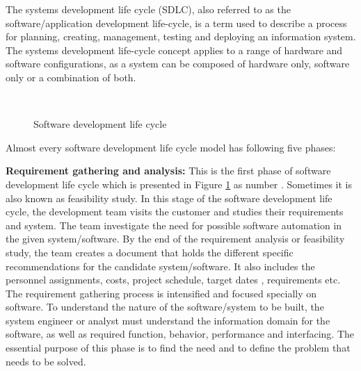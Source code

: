 The systems development life cycle (SDLC), also referred to as the software/application development life-cycle, is a term used to describe a process for planning, creating, management, testing and deploying an information system. The systems development life-cycle concept applies to a range of hardware and software configurations, as a system can be composed of hardware only, software only or a combination of both.

\begin{figure}[htbp]
	\centering
	\\
	\vspace{-3em}
	\caption{Software development life cycle}
	\label{figure_sdlc}
\end{figure}

Almost every software development life cycle model has following five phases:

\textbf{ Requirement gathering and analysis:}
This is the first phase of software development life cycle which is presented in Figure \ref{figure_sdlc} as number . Sometimes it is also known as feasibility study. In this stage of the software development life cycle, the development team visits the customer and studies their requirements and system. The team investigate the need for possible software automation in the given system/software. By the end of the requirement analysis or feasibility study, the team creates a document that holds the different specific recommendations for the candidate system/software. It also includes the personnel assignments, costs, project schedule, target dates , requirements etc. The requirement gathering process is intensified and focused specially on software. To understand the nature of the software/system to be built, the system engineer or analyst must understand the information domain for the software, as well as required function, behavior, performance and interfacing. The essential purpose of this phase is to find the need and to define the problem that needs to be solved.

